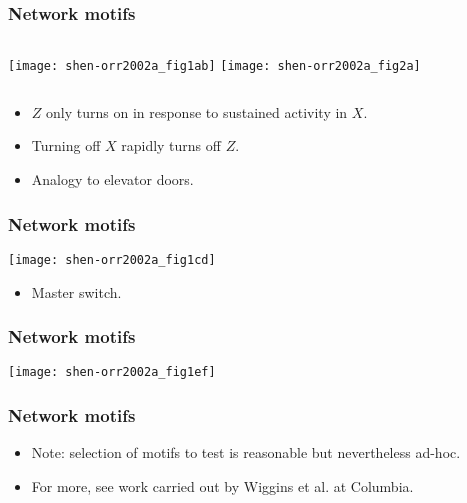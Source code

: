 \begin{frame}[label=]
  \frametitle{Network motifs}

    \begin{columns}
      \texttt{[image: shen-orr2002a\_fig1ab]}
      \texttt{[image: shen-orr2002a\_fig2a]}
    \end{columns}

    \begin{itemize}
    \item<1-> $Z$ only turns on in response to sustained activity in $X$.
    \item<2-> Turning off $X$ rapidly turns off $Z$.
    \item<3-> Analogy to elevator doors.
    \end{itemize}
  
\end{frame}

\begin{frame}[label=]
  \frametitle{Network motifs}

  \texttt{[image: shen-orr2002a\_fig1cd]}

  \begin{itemize}
  \item Master switch.
  \end{itemize}
  
\end{frame}

\begin{frame}[label=]
  \frametitle{Network motifs}

  \texttt{[image: shen-orr2002a\_fig1ef]}
  
\end{frame}

\begin{frame}[label=]
  \frametitle{Network motifs}

  \begin{itemize}
  \item<1-> Note: selection of motifs to test is reasonable
    but nevertheless ad-hoc.
  \item<2-> For more, see work carried out
    by Wiggins et al. at Columbia.
  \end{itemize}
 
\end{frame}




